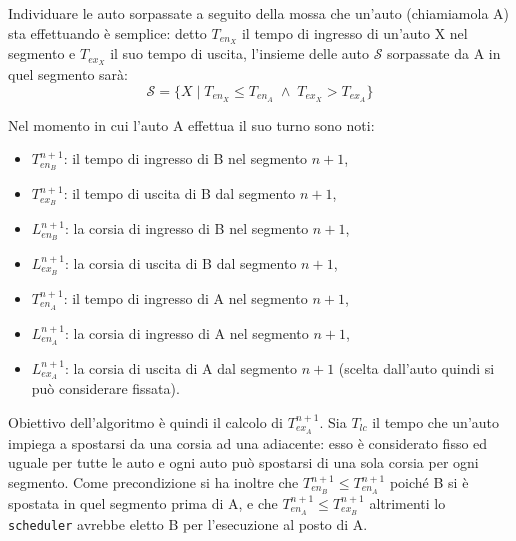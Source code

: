 Individuare le auto sorpassate a seguito della mossa che un'auto (chiamiamola A) sta effettuando è semplice: detto $T_{en_X}$ il tempo di ingresso di un'auto X nel segmento e $T_{ex_X}$ il suo tempo di uscita, l'insieme delle auto $\mathcal{S}$ sorpassate da A in quel segmento sarà:
\[ \mathcal{S} = \{ X \mid T_{en_X} \leq T_{en_A} \;\wedge\; T_{ex_X} > T_{ex_A}\} \]

Nel momento in cui l'auto A effettua il suo turno sono noti:
\begin{itemize}
\item $T_{en_B}^{n+1}$: il tempo di ingresso di B nel segmento $n+1$,
\item $T_{ex_B}^{n+1}$: il tempo di uscita di B dal segmento $n+1$,
\item $L_{en_B}^{n+1}$: la corsia di ingresso di B nel segmento $n+1$,
\item $L_{ex_B}^{n+1}$: la corsia di uscita di B dal segmento $n+1$,
\item $T_{en_A}^{n+1}$: il tempo di ingresso di A nel segmento $n+1$,
\item $L_{en_A}^{n+1}$: la corsia di ingresso di A nel segmento $n+1$,
\item $L_{ex_A}^{n+1}$: la corsia di uscita di A dal segmento $n+1$ (scelta dall'auto quindi si può considerare fissata).
\end{itemize}
Obiettivo dell'algoritmo è quindi il calcolo di $T_{ex_A}^{n+1}$. Sia $T_{lc}$ il tempo che un'auto impiega a spostarsi da una corsia ad una adiacente: esso è considerato fisso ed uguale per tutte le auto e ogni auto può spostarsi di una sola corsia per ogni segmento.
Come precondizione si ha inoltre che $T_{en_B}^{n+1} \leq T_{en_A}^{n+1}$ poiché B si è spostata in quel segmento prima di A, e che $T_{en_A}^{n+1} \leq T_{ex_B}^{n+1}$ altrimenti lo \texttt{scheduler} avrebbe eletto B per l'esecuzione al posto di A.


